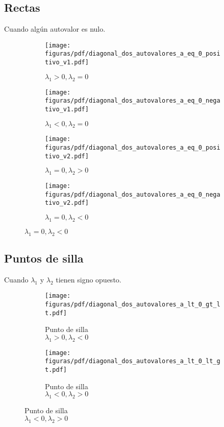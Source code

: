 \documentclass[../ecuaciones_diferenciales.tex]{subfiles}
\begin{document}
\subsection{Rectas}
Cuando algún autovalor es nulo.
\begin{figure}[ht]
  \centering
  \begin{subfigure}{0.25\textwidth}
    \centering
    \texttt{[image: figuras/pdf/diagonal\_dos\_autovalores\_a\_eq\_0\_positivo\_v1.pdf]}
    \caption*{\(\lambda_1 > 0, \lambda_2 = 0\)}
  \end{subfigure}%
  \begin{subfigure}{0.25\textwidth}
    \centering
    \texttt{[image: figuras/pdf/diagonal\_dos\_autovalores\_a\_eq\_0\_negativo\_v1.pdf]}
    \caption*{\(\lambda_1 < 0, \lambda_2 = 0\)}
  \end{subfigure}%
  \begin{subfigure}{0.25\textwidth}
    \centering
    \texttt{[image: figuras/pdf/diagonal\_dos\_autovalores\_a\_eq\_0\_positivo\_v2.pdf]}
    \caption*{\(\lambda_1 = 0, \lambda_2 > 0\)}
  \end{subfigure}%
  \begin{subfigure}{0.25\textwidth}
    \centering
    \texttt{[image: figuras/pdf/diagonal\_dos\_autovalores\_a\_eq\_0\_negativo\_v2.pdf]}
    \caption*{\(\lambda_1 = 0, \lambda_2 < 0\)}
  \end{subfigure}
\end{figure}

\subsection{Puntos de silla}
Cuando \(\lambda_1\) y \(\lambda_2\) tienen signo opuesto.
\begin{figure}[ht]
  \centering
  \begin{subfigure}{0.25\textwidth}
    \centering
    \texttt{[image: figuras/pdf/diagonal\_dos\_autovalores\_a\_lt\_0\_gt\_lt.pdf]}
    \caption*{Punto de silla \\ \(\lambda_1 > 0, \lambda_2 < 0\)}
  \end{subfigure}%
  \begin{subfigure}{0.25\textwidth}
    \centering
    \texttt{[image: figuras/pdf/diagonal\_dos\_autovalores\_a\_lt\_0\_lt\_gt.pdf]}
    \caption*{Punto de silla \\ \(\lambda_1 < 0, \lambda_2 > 0\)}
  \end{subfigure}
\end{figure}
\end{document}
